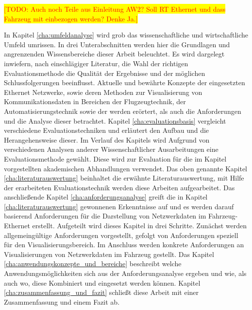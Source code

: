 \documentclass[draft=false
              ,paper=a4
              ,twoside=false
              ,fontsize=11pt
              ,headsepline
              ,BCOR10mm
              ,DIV11
              ]{scrbook}
\newcommand{\TODO}[1]{\colorbox{yellow}{\textcolor{red}{[TODO: #1]}}}
\begin{document}
\TODO{Auch noch Teile aus Einleitung AW2? Soll RT Ethernet und dass Fahrzeug mit einbezogen werden? Denke Ja.}
\fi

In Kapitel \ref{cha:umfeldanalyse} wird grob das wissenschaftliche und wirtschaftliche Umfeld umrissen. In drei Unterabschnitten werden hier die Grundlagen und angrenzenden Wissensbereiche dieser Arbeit beleuchtet. Es wird dargelegt inwiefern, nach einschlägiger Literatur, die Wahl der richtigen Evaluationsmethode die Qualität der Ergebnisse und der möglichen Schlussfolgerungen beeinflusst. Aktuelle und bewährte Konzepte der eingesetzten Ethernet Netzwerke, sowie deren Methoden zur Visualisierung von Kommunikationsdaten in Bereichen der Flugzeugtechnik, der Automatisierungstechnik sowie der werden erörtert, als auch die Anforderungen und die Analyse dieser betrachtet. 
Kapitel \ref{cha:evaluationsbasis} vergleicht verschiedene Evaluationstechniken und erläutert den Aufbau und die Herangehensweise dieser. Im Verlauf des Kapitels wird Aufgrund von verschiedenen Analysen anderer Wissenschaftlicher Ausarbeitungen eine Evaluationsmethode gewählt. Diese wird zur Evaluation für die im Kapitel  vorgestellten akademischen Abhandlungen verwendet. Das oben genannte Kapitel \ref{cha:literaturauswertung} beinhaltet die erwähnte Literaturauswertung, mit Hilfe der erarbeiteten Evaluationstechnik werden diese Arbeiten aufgearbeitet. Das anschließende Kapitel \ref{cha:anforderungsanalyse} greift die in Kapitel \ref{cha:literaturauswertung} gewonnenen Erkenntnisse auf und es werden darauf basierend Anforderungen für die Darstellung von Netzwerkdaten im Fahrzeug-Ethernet erstellt. Aufgeteilt wird dieses Kapitel in drei Schritte. Zunächst werden allgemeingültige Anforderungen vorgestellt, gefolgt von Anforderungen speziell für den Visualisierungsbereich. Im Anschluss werden konkrete Anforderungen an Visualisierungen von Netzwerkdaten im Fahrzeug gestellt. 
Das Kapitel \ref{cha:anwendungskonzepte_und_bereiche} beschreibt welche Anwendungsmöglichkeiten sich aus der Anforderungsanalyse ergeben und wie, als auch wo, diese Kombiniert und eingesetzt werden können. Kapitel \ref{cha:zusammenfassung_und_fazit} schließt diese Arbeit mit einer Zusammenfassung und einem Fazit ab.
\end{document}

